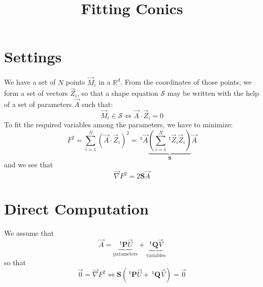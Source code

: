 \documentclass[aps]{revtex4}
\newcommand{\mymat}[1]{\boldsymbol{#1}}
\newcommand{\mytrn}[1]{~^{\mathsf{t}}\!{#1}}
\newcommand{\mygrad}{\vec{\nabla}}
\begin{document}
\title{Fitting Conics}
\maketitle
\section{Settings}

We have a set of $N$ points $\vec{M}_i$ in a $\mathbb{R}^d$.
From the coordinates of those points, we form a set of vectors $\vec{Z}_i$,
so that a shape equation $\mathcal{S}$ may be written with the help of a set of parameters $\vec{A}$
such that:
\begin{equation}
\vec{M}_i\in\mathcal{S} \Leftrightarrow \vec{A}\cdot\vec{Z}_i = 0
\end{equation}
To fit the required variables among the parameters, we have to minimize:
\begin{equation}
 F^2 = \sum_{i=1}^N \left(\vec{A}\cdot\vec{Z}_i\right)^2
  = \mytrn{\vec{A}} \underbrace{\left(\sum_{i=1}^N\mytrn{\vec{Z}_i}\vec{Z}_i\right)}_{\mymat{S}} \vec{A}
\end{equation}
and we see that
\begin{equation}
	\mygrad F^2 = 2 \mymat{S} \vec{A}
\end{equation}

\section{Direct Computation}
We assume that
\begin{equation}
	\vec{A} = \underbrace{\mytrn{\mymat{P}} \vec{U}}_{\text{parameters}} + \underbrace{\mytrn{\mymat{Q}} \vec{V}}_{\text{variables}}
\end{equation}
so that
\begin{equation}
 \vec{0} = \mygrad F^2 \Leftrightarrow \mymat{S}\left(\mytrn{\mymat{P}} \vec{U} + \mytrn{\mymat{Q}} \vec{V}\right) = \vec{0}
\end{equation}
\end{document}
